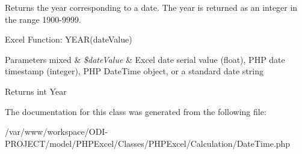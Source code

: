 Returns the year corresponding to a date. The year is returned as an integer in the range 1900-\/9999.

Excel Function\+: Y\+E\+A\+R(date\+Value)


\begin{DoxyParams}[1]{Parameters}
mixed & {\em \$date\+Value} & Excel date serial value (float), P\+H\+P date timestamp (integer), P\+H\+P Date\+Time object, or a standard date string \\
\hline
\end{DoxyParams}
\begin{DoxyReturn}{Returns}
int Year 
\end{DoxyReturn}


The documentation for this class was generated from the following file\+:\begin{DoxyCompactItemize}
\item 
/var/www/workspace/\+O\+D\+I-\/\+P\+R\+O\+J\+E\+C\+T/model/\+P\+H\+P\+Excel/\+Classes/\+P\+H\+P\+Excel/\+Calculation/Date\+Time.\+php\end{DoxyCompactItemize}
